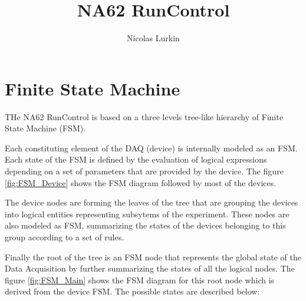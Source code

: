 \documentclass[a4paper]{article}
\title{NA62 RunControl}
\author{Nicolas Lurkin}
\begin{document}
\maketitle

\section{Finite State Machine}
THe NA62 RunControl is based on a three levels tree-like hierarchy of Finite State Machine (FSM). 

Each constituting element of the DAQ (device) is internally modeled as an FSM. Each state of the
FSM is defined by the evaluation of logical expressions depending on a set of parameters that are
provided by the device. The figure \ref{fig:FSM_Device} shows the FSM diagram followed by most of
the devices.

The device nodes are forming the leaves of the tree that are grouping the devices into logical
entities representing subsytems of the experiment. These nodes are also modeled as FSM, summarizing
the states of the devices belonging to this group according to a set of rules.

Finally the root of the tree is an FSM node that represents the global state of the Data Acquisition
by further summarizing the states of all the logical nodes. The figure \ref{fig:FSM_Main} shows the
FSM diagram for this root node which is derived from the device FSM. The possible states are
described below:
\end{document}
